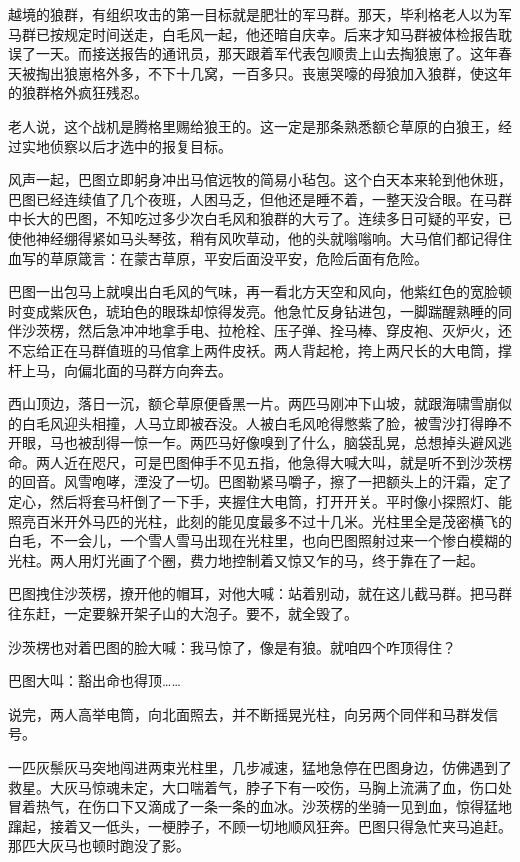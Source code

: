 \par 越境的狼群，有组织攻击的第一目标就是肥壮的军马群。那天，毕利格老人以为军马群已按规定时间送走，白毛风一起，他还暗自庆幸。后来才知马群被体检报告耽误了一天。而接送报告的通讯员，那天跟着军代表包顺贵上山去掏狼崽了。这年春天被掏出狼崽格外多，不下十几窝，一百多只。丧崽哭嚎的母狼加入狼群，使这年的狼群格外疯狂残忍。
\par 老人说，这个战机是腾格里赐给狼王的。这一定是那条熟悉额仑草原的白狼王，经过实地侦察以后才选中的报复目标。
\par 风声一起，巴图立即躬身冲出马倌远牧的简易小毡包。这个白天本来轮到他休班，巴图已经连续值了几个夜班，人困马乏，但他还是睡不着，一整天没合眼。在马群中长大的巴图，不知吃过多少次白毛风和狼群的大亏了。连续多日可疑的平安，已使他神经绷得紧如马头琴弦，稍有风吹草动，他的头就嗡嗡响。大马倌们都记得住血写的草原箴言：在蒙古草原，平安后面没平安，危险后面有危险。
\par 巴图一出包马上就嗅出白毛风的气味，再一看北方天空和风向，他紫红色的宽脸顿时变成紫灰色，琥珀色的眼珠却惊得发亮。他急忙反身钻进包，一脚踹醒熟睡的同伴沙茨楞，然后急冲冲地拿手电、拉枪栓、压子弹、拴马棒、穿皮袍、灭炉火，还不忘给正在马群值班的马倌拿上两件皮袄。两人背起枪，挎上两尺长的大电筒，撑杆上马，向偏北面的马群方向奔去。
\par 西山顶边，落日一沉，额仑草原便昏黑一片。两匹马刚冲下山坡，就跟海啸雪崩似的白毛风迎头相撞，人马立即被吞没。人被白毛风呛得憋紫了脸，被雪沙打得睁不开眼，马也被刮得一惊一乍。两匹马好像嗅到了什么，脑袋乱晃，总想掉头避风逃命。两人近在咫尺，可是巴图伸手不见五指，他急得大喊大叫，就是听不到沙茨楞的回音。风雪咆哮，湮没了一切。巴图勒紧马嚼子，擦了一把额头上的汗霜，定了定心，然后将套马杆倒了一下手，夹握住大电筒，打开开关。平时像小探照灯、能照亮百米开外马匹的光柱，此刻的能见度最多不过十几米。光柱里全是茂密横飞的白毛，不一会儿，一个雪人雪马出现在光柱里，也向巴图照射过来一个惨白模糊的光柱。两人用灯光画了个圈，费力地控制着又惊又乍的马，终于靠在了一起。
\par 巴图拽住沙茨楞，撩开他的帽耳，对他大喊：站着别动，就在这儿截马群。把马群往东赶，一定要躲开架子山的大泡子。要不，就全毁了。
\par 沙茨楞也对着巴图的脸大喊：我马惊了，像是有狼。就咱四个咋顶得住？
\par 巴图大叫：豁出命也得顶……
\par 说完，两人高举电筒，向北面照去，并不断摇晃光柱，向另两个同伴和马群发信号。
\par 一匹灰鬃灰马突地闯进两束光柱里，几步减速，猛地急停在巴图身边，仿佛遇到了救星。大灰马惊魂未定，大口喘着气，脖子下有一咬伤，马胸上流满了血，伤口处冒着热气，在伤口下又滴成了一条一条的血冰。沙茨楞的坐骑一见到血，惊得猛地蹿起，接着又一低头，一梗脖子，不顾一切地顺风狂奔。巴图只得急忙夹马追赶。那匹大灰马也顿时跑没了影。
